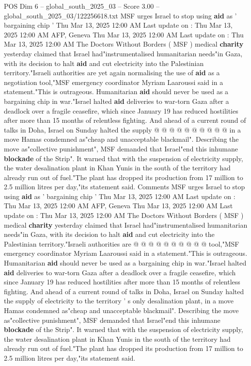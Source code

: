 \begin{textsample}{POS Dim 6 – global\_south\_2025\_03 – Score 3.00 – global\_south\_2025\_03/122256618.txt}  \label{ex:f6_pos_230}
MSF urges Israel to stop using \textbf{aid} as ' bargaining chip ' Thu Mar 13, 2025 12:00 AM Last update on : Thu Mar 13, 2025 12:00 AM AFP, Geneva Thu Mar 13, 2025 12:00 AM Last update on : Thu Mar 13, 2025 12:00 AM The Doctors Without Borders ( MSF ) medical \textbf{charity} yesterday claimed that Israel had"instrumentalised humanitarian needs"in Gaza, with its decision to halt \textbf{aid} and cut electricity into the Palestinian territory."Israeli authorities are yet again normalising the use of \textbf{aid} as a negotiation tool,"MSF emergency coordinator Myriam Laaroussi said in a statement."This is outrageous.
Humanitarian \textbf{aid} should never be used as a bargaining chip in war."Israel halted \textbf{aid} deliveries to war-torn Gaza after a deadlock over a fragile ceasefire, which since January 19 has reduced hostilities after more than 15 months of relentless fighting.
And ahead of a current round of talks in Doha, Israel on Sunday halted the supply @ @ @ @ @ @ @ @ @ @ in a move Hamas condemned as"cheap and unacceptable blackmail".
Describing the move as"collective punishment", MSF demanded that Israel"end this inhumane \textbf{blockade} of the Strip".
It warned that with the suspension of electricity supply, the water desalination plant in Khan Yunis in the south of the territory had already run out of fuel."The plant has dropped its production from 17 million to 2.5 million litres per day,"its statement said.
Comments MSF urges Israel to stop using \textbf{aid} as ' bargaining chip ' Thu Mar 13, 2025 12:00 AM Last update on : Thu Mar 13, 2025 12:00 AM AFP, Geneva Thu Mar 13, 2025 12:00 AM Last update on : Thu Mar 13, 2025 12:00 AM The Doctors Without Borders ( MSF ) medical \textbf{charity} yesterday claimed that Israel had"instrumentalised humanitarian needs"in Gaza, with its decision to halt \textbf{aid} and cut electricity into the Palestinian territory."Israeli authorities are @ @ @ @ @ @ @ @ @ @ tool,"MSF emergency coordinator Myriam Laaroussi said in a statement."This is outrageous.
Humanitarian \textbf{aid} should never be used as a bargaining chip in war."Israel halted \textbf{aid} deliveries to war-torn Gaza after a deadlock over a fragile ceasefire, which since January 19 has reduced hostilities after more than 15 months of relentless fighting.
And ahead of a current round of talks in Doha, Israel on Sunday halted the supply of electricity to the territory ' s only desalination plant, in a move Hamas condemned as"cheap and unacceptable blackmail".
Describing the move as"collective punishment", MSF demanded that Israel"end this inhumane \textbf{blockade} of the Strip".
It warned that with the suspension of electricity supply, the water desalination plant in Khan Yunis in the south of the territory had already run out of fuel."The plant has dropped its production from 17 million to 2.5 million litres per day,"its statement said.

\end{textsample}
